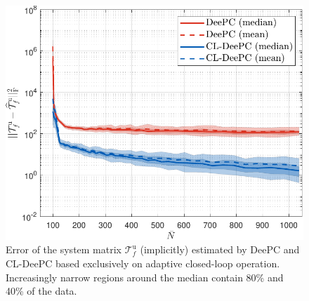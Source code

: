 \begin{figure}[t!]
\begin{center}
\includegraphics[width=\columnwidth]{results/figures/Consistency_Nbar_99-1039-50_p_20_f_20_Re_1_Ru_1_Rdu_0_Q_100_R_0_dR_10.pdf}    %
\caption{Error of the system matrix $\mathcal{T}_f^\mathrm{u}$ (implicitly) estimated by \ac{DeePC} and \ac{CL-DeePC} based exclusively on adaptive closed-loop operation. Increasingly narrow regions around the median contain 80\% and 40\% of the data.}  %
\label{fig:Tuf_consistency}                                 %
\end{center}                                 %
\end{figure}
